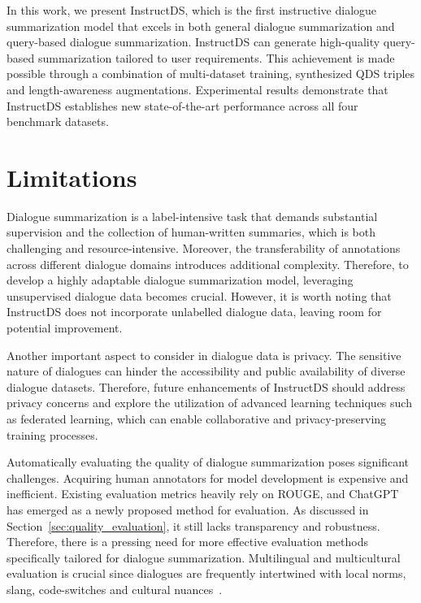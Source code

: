 \documentclass[11pt]{article}
\begin{document}
    In this work, we present InstructDS, which is the first instructive dialogue summarization model that excels in both general dialogue summarization and query-based dialogue summarization. InstructDS can generate high-quality query-based summarization tailored to user requirements. This achievement is made possible through a combination of multi-dataset training, synthesized QDS triples and length-awareness augmentations. Experimental results demonstrate that InstructDS establishes new state-of-the-art performance across all four benchmark datasets.
    


\section*{Limitations}

    Dialogue summarization is a label-intensive task that demands substantial supervision and the collection of human-written summaries, which is both challenging and resource-intensive. Moreover, the transferability of annotations across different dialogue domains introduces additional complexity. Therefore, to develop a highly adaptable dialogue summarization model, leveraging unsupervised dialogue data becomes crucial. However, it is worth noting that InstructDS does not incorporate unlabelled dialogue data, leaving room for potential improvement.

    Another important aspect to consider in dialogue data is privacy. The sensitive nature of dialogues can hinder the accessibility and public availability of diverse dialogue datasets. Therefore, future enhancements of InstructDS should address privacy concerns and explore the utilization of advanced learning techniques such as federated learning, which can enable collaborative and privacy-preserving training processes.
    

    Automatically evaluating the quality of dialogue summarization poses significant challenges. Acquiring human annotators for model development is expensive and inefficient. Existing evaluation metrics heavily rely on ROUGE, and ChatGPT has emerged as a newly proposed method for evaluation. As discussed in Section~\ref{sec:quality_evaluation}, it still lacks transparency and robustness. Therefore, there is a pressing need for more effective evaluation methods specifically tailored for dialogue summarization. Multilingual and multicultural evaluation is crucial since dialogues are frequently intertwined with local norms, slang, code-switches and cultural nuances~\cite{wang2023seaeval}.
    
\end{document}

